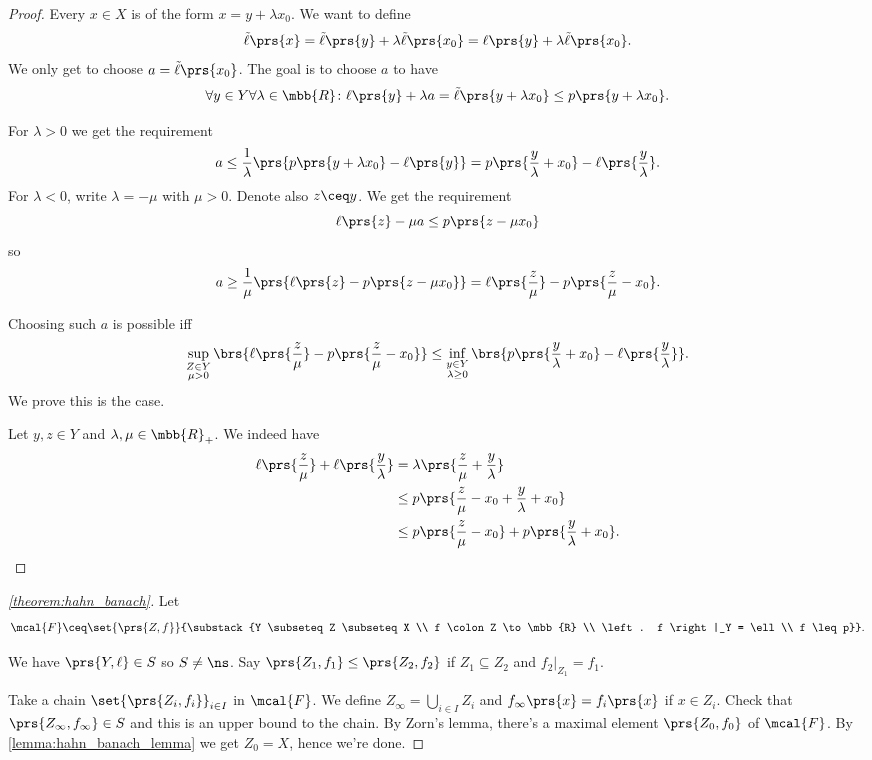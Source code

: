 \documentclass[10pt, twoside]{book}
\begin{document}
\begin{proof}
Every $x \in X$ is of the form $x = y + \lambda x_0$. We want to define
\[\tilde{\ell}\prs{x} = \tilde{\ell} \prs{y} + \lambda \tilde{\ell}\prs{x_0} = \ell\prs{y} + \lambda \tilde{\ell}\prs{x_0} \text{.}\]
We only get to choose $a = \tilde{\ell}\prs{x_0}$. The goal is to choose $a$ to have
\[\forall y \in Y \forall \lambda \in \mbb{R} \colon \ell\prs{y} + \lambda a = \tilde{\ell} \prs{y + \lambda x_0} \leq p\prs{y + \lambda x_0} \text{.}\]

For $\lambda > 0$ we get the requirement
\[a \leq \frac{1}{\lambda} \prs{p \prs{y + \lambda x_0} - \ell\prs{y}} = p\prs{\frac{y}{\lambda} + x_0} - \ell\prs{\frac{y}{\lambda}} \text{.}\]
For $\lambda < 0$, write $\lambda = - \mu$ with $\mu > 0$. Denote also $z \ceq y$. We get the requirement
\[\ell\prs{z} - \mu a \leq p\prs{z - \mu x_0}\]
so
\[a \geq \frac{1}{\mu} \prs{\ell\prs{z} - p\prs{z-\mu x_0}} = \ell\prs{\frac{z}{\mu}} - p\prs{\frac{z}{\mu} - x_0} \text{.}\]

Choosing such $a$ is possible iff
\[\sup_{\substack{Z \in Y \\ \mu > 0}} \brs{\ell\prs{\frac{z}{\mu}} - p\prs{\frac{z}{\mu} - x_0}} \leq \inf_{\substack{y \in Y \\ \lambda \geq 0}} \brs{p\prs{\frac{y}{\lambda} + x_0} - \ell\prs{\frac{y}{\lambda}}} \text{.}\]
We prove this is the case.

Let $y,z \in Y$ and $\lambda,\mu \in \mbb{R}_+$.
We indeed have
\begin{align*}
\ell\prs{\frac{z}{\mu}} + \ell\prs{\frac{y}{\lambda}} &= \lambda\prs{\frac{z}{\mu} + \frac{y}{\lambda}}
\\&\leq
p\prs{\frac{z}{\mu} - x_0 + \frac{y}{\lambda} + x_0}
\\&\leq
p\prs{\frac{z}{\mu} - x_0} + p\prs{\frac{y}{\lambda} + x_0} \text{.}
\end{align*}
\end{proof}

\begin{proof}[\ref{theorem:hahn_banach}]
Let
\[\mcal{F} \ceq \set{\prs{Z, f}}{\substack{Y \subseteq Z \subseteq X \\ f \colon Z \to \mbb{R} \\ \left. f \right|_Y = \ell \\ f \leq p}} \text{.}\]

We have $\prs{Y, \ell} \in S$ so $S \neq \ns$.
Say $\prs{Z_1, f_1} \leq \prs{Z_2, f_2}$ if $Z_1 \subseteq Z_2$ and $\left. f_2 \right|_{Z_1} = f_1$.

Take a chain $\set{\prs{Z_i, f_i}}_{i \in I}$ in $\mcal{F}$. We define $Z_\infty = \bigcup_{i \in I} Z_i$ and $f_\infty\prs{x} = f_i\prs{x}$ if $x \in Z_i$. Check that $\prs{Z_\infty, f_\infty} \in S$ and this is an upper bound to the chain.
By Zorn's lemma, there's a maximal element $\prs{Z_0, f_0}$ of $\mcal{F}$.
By \ref{lemma:hahn_banach_lemma} we get $Z_0 = X$, hence we're done.
\end{proof}
\end{document}
